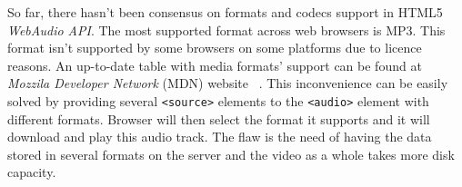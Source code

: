 So far, there hasn't been consensus on formats and codecs support in HTML5 \textit{WebAudio API}. The most supported format across web browsers is MP3. This format isn't supported by some browsers on some platforms due to licence reasons. An up-to-date table with media formats' support can be found at \textit{Mozzila Developer Network} (MDN) website ~\cite{mdn_audio_formats}. This inconvenience can be easily solved by providing several \verb|<source>| elements to the \verb|<audio>| element with different formats. Browser will then select the format it supports and it will download and play this audio track. The flaw is the need of having the data stored in several formats on the server and the video as a whole takes more disk capacity.

\vfill

